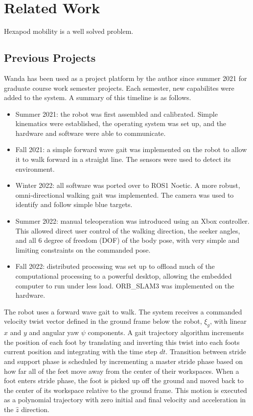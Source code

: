 \section{Related Work}

Hexapod mobility is a well solved problem. 

\subsection{ Previous Projects }

Wanda has been used as a project platform by the author since summer 2021 for graduate course work semester projects. Each semester, new capabilites were added to the system. A summary of this timeline is as follows.

\begin{itemize}
    \item Summer 2021: the robot was first assembled and calibrated. Simple kinematics were established, the operating system was set up, and the hardware and software were able to communicate.
    \item Fall 2021: a simple forward wave gait was implemented on the robot to allow it to walk forward in a straight line. The sensors were used to detect its environment. 
    \item Winter 2022: all software was ported over to ROS1 Noetic. A more robust, omni-directional walking gait was implemented. The camera was used to identify and follow simple blue targets.
    \item Summer 2022: manual teleoperation was introduced using an Xbox controller. This allowed direct user control of the walking direction, the seeker angles, and all 6 degree of freedom (DOF) of the body pose, with very simple and limiting constraints on the commanded pose.
    \item Fall 2022: distributed processing was set up to offload much of the computational processing to a powerful desktop, allowing the embedded computer to run under less load. ORB\_SLAM3 \cite{orbslam} was implemented on the hardware.
\end{itemize}

The robot uses a forward wave gait to walk. The system receives a commanded velocity twist vector defined in the ground frame below the robot, $\xi_g$, with linear $x$ and $y$ and angular yaw $\psi$ components. A gait trajectory algorithm increments the position of each foot by translating and inverting this twist into each foots current position and integrating with the time step $dt$. Transition between stride and support phase is scheduled by incrementing a master stride phase based on how far all of the feet move away from the center of their workspaces. When a foot enters stride phase, the foot is picked up off the ground and moved back to the center of its workspace relative to the ground frame. This motion is executed as a polynomial trajectory with zero initial and final velocity and acceleration in the $\hat{z}$ direction. 


